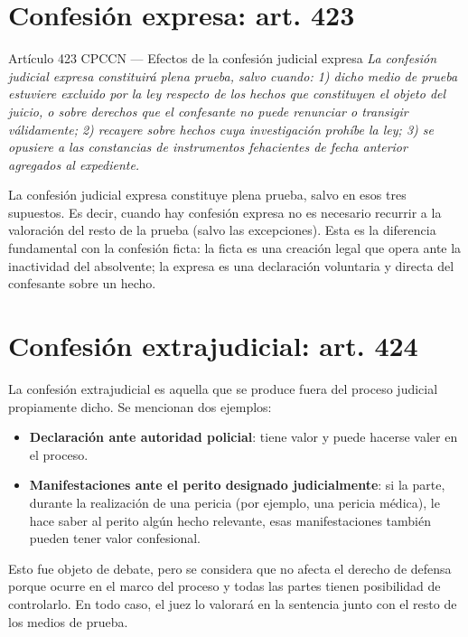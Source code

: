 \documentclass[12pt,oneside]{book}
\begin{document}
\section{Confesión expresa: art. 423}

\begin{norma}{Artículo 423 CPCCN --- Efectos de la confesión judicial expresa}
\textit{La confesión judicial expresa constituirá plena prueba, salvo cuando: 1) dicho medio de prueba estuviere excluido por la ley respecto de los hechos que constituyen el objeto del juicio, o sobre derechos que el confesante no puede renunciar o transigir válidamente; 2) recayere sobre hechos cuya investigación prohíbe la ley; 3) se opusiere a las constancias de instrumentos fehacientes de fecha anterior agregados al expediente.}
\end{norma}

La confesión judicial expresa constituye plena prueba, salvo en esos tres supuestos. Es decir, cuando hay confesión expresa no es necesario recurrir a la valoración del resto de la prueba (salvo las excepciones). Esta es la diferencia fundamental con la confesión ficta: la ficta es una creación legal que opera ante la inactividad del absolvente; la expresa es una declaración voluntaria y directa del confesante sobre un hecho.

\section{Confesión extrajudicial: art. 424}

La confesión extrajudicial es aquella que se produce fuera del proceso judicial propiamente dicho. Se mencionan dos ejemplos:
\begin{itemize}
    \item \textbf{Declaración ante autoridad policial}: tiene valor y puede hacerse valer en el proceso.
    \item \textbf{Manifestaciones ante el perito designado judicialmente}: si la parte, durante la realización de una pericia (por ejemplo, una pericia médica), le hace saber al perito algún hecho relevante, esas manifestaciones también pueden tener valor confesional.
\end{itemize}

Esto fue objeto de debate, pero se considera que no afecta el derecho de defensa porque ocurre en el marco del proceso y todas las partes tienen posibilidad de controlarlo. En todo caso, el juez lo valorará en la sentencia junto con el resto de los medios de prueba.
\end{document}
